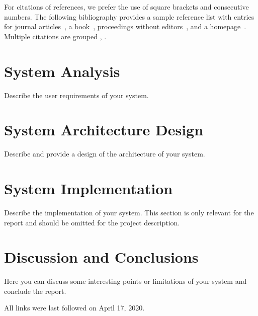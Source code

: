 \documentclass[runningheads]{llncs}
\begin{document}
For citations of references, we prefer the use of square brackets
and consecutive numbers. The following bibliography provides
a sample reference list with entries for journal
articles~\cite{ref_article1}, a book~\cite{ref_book1}, proceedings without editors~\cite{ref_proc1},
and a homepage~\cite{ref_url1}. Multiple citations are grouped
\cite{ref_article1,ref_book1},
\cite{ref_article1,ref_book1,ref_proc1,ref_url1}.

\section{System Analysis}
Describe the user requirements of your system.

\section{System Architecture Design}
Describe and provide a design of the architecture of your system.

\section{System Implementation}
Describe the implementation of your system. This section is only relevant for the report and should be omitted for the project description. 

\section{Discussion and Conclusions}
Here you can discuss some interesting points or limitations of your system and conclude the report.

%
%



All links were last followed on April 17, 2020.
\end{document}
